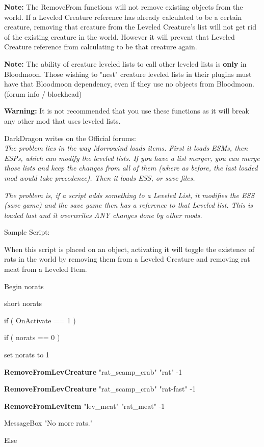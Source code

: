 \documentclass[
]{article}
\begin{document}
\textbf{Note:} The RemoveFrom functions will not remove existing objects
from the world. If a Leveled Creature reference has already calculated
to be a certain creature, removing that creature from the Leveled
Creature's list will not get rid of the existing creature in the world.
However it will prevent that Leveled Creature reference from calculating
to be that creature again.

\textbf{Note:} The ability of creature leveled lists to call other
leveled lists is \textbf{only} in Bloodmoon. Those wishing to "nest"
creature leveled lists in their plugins must have that Bloodmoon
dependency, even if they use no objects from Bloodmoon. (forum info /
blockhead)

\textbf{Warning:} It is not recommended that you use these functions as
it will break any other mod that uses leveled lists.

DarkDragon writes on the Official forums:\\
\emph{The problem lies in the way Morrowind loads items. First it loads
ESMs, then ESPs, which can modify the leveled lists. If you have a list
merger, you can merge those lists and keep the changes from all of them
(where as before, the last loaded mod would take precedence). Then it
loads ESS, or save files.}

\emph{\hfill\break
The problem is, if a script adds something to a Leveled List, it
modifies the ESS (save game) and the save game then has a reference to
that Leveled list. This is loaded last and it overwrites ANY changes
done by other mods.}

Sample Script:

When this script is placed on an object, activating it will toggle the
existence of rats in the world by removing them from a Leveled Creature
and removing rat meat from a Leveled Item.

Begin norats

short norats

if ( OnActivate == 1 )

if ( norats == 0 )

set norats to 1

\textbf{RemoveFromLevCreature} "rat\_scamp\_crab" "rat" -1

\textbf{RemoveFromLevCreature} "rat\_scamp\_crab" "rat-fast" -1

\textbf{RemoveFromLevItem} "lev\_meat" "rat\_meat" -1

MessageBox "No more rats."

Else
\end{document}
